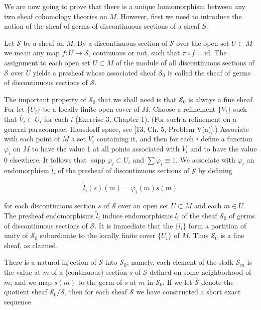 We are now going to prove that there is a unique homomorphism between any two sheaf cohomology theories on $M$. However, first we need to introduce the notion of the sheaf of germs of discontinuous sections of a sheaf $S$.

\label{thm:5.22} Let $\mathcal{S}$ be a sheaf on $M$. By a discontinuous section of $\mathcal{S}$ over the open set $U \subset M$ we mean any map $f: U \to \mathcal{S}$, continuous or not, such that $\pi \circ f = \mathrm{id}$. The assignment to each open set $U \subset M$ of the module of all discontinuous sections of $\mathcal{S}$ over $U$ yields a presheaf whose associated sheaf $\mathcal{S}_0$ is called the sheaf of germs of discontinuous sections of $\mathcal{S}$.

The important property of $\mathcal{S}_{0}$ that we shall need is that $\mathcal{S}_{0}$ is always a fine sheaf. For let $\{U_{i}\}$ be a locally finite open cover of $M$. Choose a refinement $\{V_{i}\}$ such that $\overline{V}_{i} \subset U_{i}$ for each $i$ (Exercise 3, Chapter 1). (For such a refinement on a general paracompact Hausdorff space, see [13, Ch. 5, Problem V(a)].) Associate with each point of $M$ a set $V_{i}$ containing it, and then for each $i$ define a function $\varphi_{i}$ on $M$ to have the value 1 at all points associated with $V_{i}$ and to have the value 0 elsewhere. It follows that $\operatorname{supp} \varphi_{i} \subset U_{i}$ and $\sum \varphi_{i} \equiv 1$. We associate with $\varphi_{i}$ an endomorphism $\widetilde{l}_{i}$ of the presheaf of discontinuous sections of $\mathcal S$ by defining

\begin{equation}
\tag{1}\label{eq:5.22:1}
\tilde{l}_{i}(s)(m)=\varphi_{i}(m)s(m)
\end{equation}

for each discontinuous section $s$ of $\mathcal{S}$ over an open set $U \subset M$ and each $m \in U$. The presheaf endomorphisms $\tilde{l}_{i}$ induce endomorphisms $l_{i}$ of the sheaf $\mathcal{S}_{0}$ of germs of discontinuous sections of $\mathcal{S}$. It is immediate that the $\{l_{i}\}$ form a partition of unity of $\mathcal{S}_{0}$ subordinate to the locally finite cover $\{U_{i}\}$ of $M$. Thus $\mathcal{S}_{0}$ is a fine sheaf, as claimed.

There is a natural injection of $\mathcal{S}$ into $\mathcal{S}_0$; namely, each element of the stalk $\mathcal{S}_m$ is the value at $m$ of a (continuous) section $s$ of $\mathcal{S}$ defined on some neighborhood of $m$, and we map $s(m)$ to the germ of $s$ at $m$ in $\mathcal{S}_0$. If we let $\overline{\mathcal{S}}$ denote the quotient sheaf $\mathcal{S}_0/\mathcal{S}$, then for each sheaf $\mathcal{S}$ we have constructed a short exact sequence

